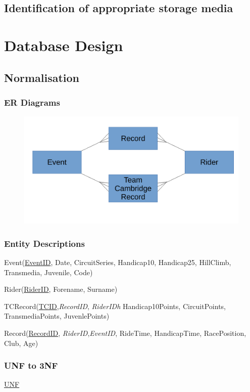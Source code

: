 \subsection{Identification of appropriate storage media}

\section{Database Design}

\subsection{Normalisation}

\subsubsection{ER Diagrams}
\begin{figure}[H]
    \includegraphics[width=\textwidth]{./ER/ERDesing.pdf}
\end{figure}

\subsubsection{Entity Descriptions}
Event(\underline{EventID}, Date, CircuitSeries, Handicap10, Handicap25, HillClimb, Transmedia, Juvenile, Code)

Rider(\underline{RiderID}, Forename, Surname)

TCRecord(\underline{TCID},\emph{RecordID}, \emph{RiderIDh} Handicap10Points, CircuitPoints, TransmediaPoints, JuvenlePoints)

Record(\underline{RecordID}, \emph{RiderID},\emph{EventID}, RideTime, HandicapTime, RacePosition, Club, Age)

\subsubsection{UNF to 3NF}
\underline{UNF}


